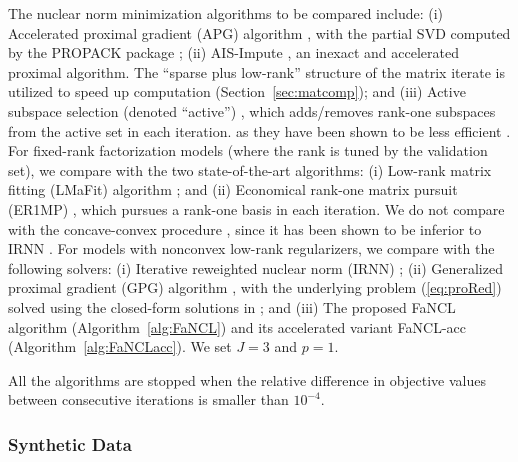 \documentclass[10pt,journal,compsoc]{IEEEtran}
\begin{document}
The nuclear norm minimization algorithms to be compared include:
(i) Accelerated proximal gradient (\textsf{APG}) algorithm \cite{ji2009accelerated,toh2010accelerated}, 
with the partial SVD computed by the PROPACK package \cite{larsen1998lanczos};
(ii) \textsf{AIS-Impute} \cite{mazumder2010spectral}, an inexact and accelerated proximal algorithm.
The ``sparse plus low-rank'' structure of  the
matrix iterate is utilized to speed up computation (Section~\ref{sec:matcomp}); and
(iii) Active subspace selection 
(denoted ``\textsf{active}'') \cite{hsieh2014nuclear}, which adds/removes rank-one subspaces from the active set in each iteration.  
as they have been shown to be less efficient 
\cite{hsieh2014nuclear,quan2015impute}.
For fixed-rank factorization models
(where the rank is tuned by the validation set),
we compare with the two state-of-the-art algorithms:
(i) Low-rank matrix fitting (\textsf{LMaFit})
	algorithm
	\cite{wen2012solving}; and
(ii) Economical rank-one matrix pursuit (\textsf{ER1MP}) \cite{wang2015orthogonal},
	which pursues a rank-one basis in each iteration.
We do not compare with the concave-convex procedure \cite{zhang2010analysis,hu2013fast}, since
it has been shown to be inferior to \textsf{IRNN} \cite{gongZLHY2013}.
For models with nonconvex low-rank regularizers, 
we compare with the following solvers:
(i) Iterative reweighted nuclear norm (\textsf{IRNN})	\cite{lu2016nonconvex};
(ii) Generalized proximal gradient (\textsf{GPG}) algorithm \cite{lu2015generalized}, with the
	underlying problem (\ref{eq:proRed}) solved using the closed-form solutions
	in \cite{gongZLHY2013}; and
(iii) The proposed \textsf{FaNCL} algorithm (Algorithm~\ref{alg:FaNCL}) and its
	accelerated variant \textsf{\textsf{FaNCL}-acc} 
	(Algorithm~\ref{alg:FaNCLacc}).
	We set $J = 3$ and $p = 1$.

All the algorithms are  stopped when the relative difference
in objective values between consecutive iterations is smaller than 
${10}^{-4}$.





\subsubsection{Synthetic Data}
\label{sec:matcomp:syn}
\end{document}
